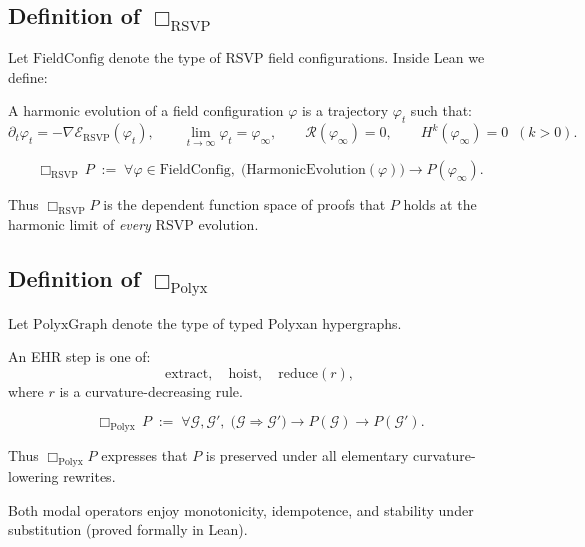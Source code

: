 \subsection{Definition of $\Box_{\mathrm{RSVP}}$}

Let $\mathrm{FieldConfig}$ denote the type of RSVP field configurations.
Inside Lean we define:

\begin{definition}
A harmonic evolution of a field configuration $\varphi$ is a trajectory
$\varphi_t$ such that:
\[
\partial_t \varphi_t = -\nabla \mathcal{E}_{\mathrm{RSVP}}(\varphi_t),
\qquad
\lim_{t\to\infty}\varphi_t = \varphi_\infty,
\qquad
\mathcal{R}(\varphi_\infty)=0,
\qquad
H^k(\varphi_\infty)=0\;\;(k>0).
\]
\end{definition}

\begin{definition}
\[
\Box_{\mathrm{RSVP}}\,P
\;:=\;
\forall\varphi\in\mathrm{FieldConfig},\;
  \bigl(\mathrm{HarmonicEvolution}(\varphi)\bigr)\to P(\varphi_\infty).
\]
\end{definition}

Thus $\Box_{\mathrm{RSVP}} P$ is the dependent function space of proofs
that $P$ holds at the harmonic limit of \emph{every} RSVP evolution.


\subsection{Definition of $\Box_{\mathrm{Polyx}}$}

Let $\mathrm{PolyxGraph}$ denote the type of typed Polyxan hypergraphs.

\begin{definition}
An EHR step is one of:
\[
\mathrm{extract},\quad \mathrm{hoist},\quad \mathrm{reduce}(r),
\]
where $r$ is a curvature-decreasing rule.
\end{definition}

\begin{definition}
\[
\Box_{\mathrm{Polyx}}\,P
\;:=\;
\forall \mathcal{G},\mathcal{G}',\;
    \bigl(\mathcal{G}\Rightarrow\mathcal{G}'\bigr)
    \to P(\mathcal{G})\to P(\mathcal{G}').
\]
\end{definition}

Thus $\Box_{\mathrm{Polyx}} P$ expresses that $P$ is preserved under all
elementary curvature-lowering rewrites.

Both modal operators enjoy monotonicity, idempotence, and stability under
substitution (proved formally in Lean).


